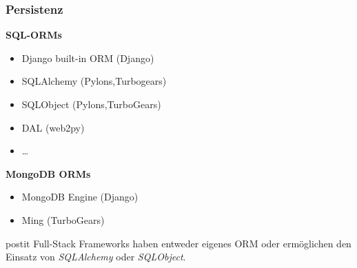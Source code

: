 \documentclass[
    t,
    smaller,
    compress,
    xcolor=svgnames,            %
    table,
]{beamer}
\newenvironment{beamerpostit}[1]%
{\begin{beamercolorbox}[wd=\textwidth,sep=2pt,rounded=true,shadow=true]{postit} #1}%
{\end{beamercolorbox}}%
\begin{document}
\begin{frame}
\end{frame}


%
%





\begin{frame}
  \frametitle{Persistenz}

    \textbf{SQL-ORMs}
    \begin{itemize}[<1->]
        \item Django built-in ORM (Django)
        \item SQLAlchemy (Pylons,Turbogears) %
        \item SQLObject (Pylons,TurboGears)
        \item DAL (web2py)
        \item \dots
     \end{itemize}
     \textbf{MongoDB ORMs}
    \begin{itemize}[<1->]
        \item MongoDB Engine (Django)
        \item Ming (TurboGears)
    \end{itemize}

  \vspace{12pt}
  \begin{beamerpostit}
     Full-Stack Frameworks haben entweder eigenes ORM oder ermöglichen den Einsatz von \textit{SQLAlchemy} oder \textit{SQLObject}.
  \end{beamerpostit}

\end{frame}
\end{document}
